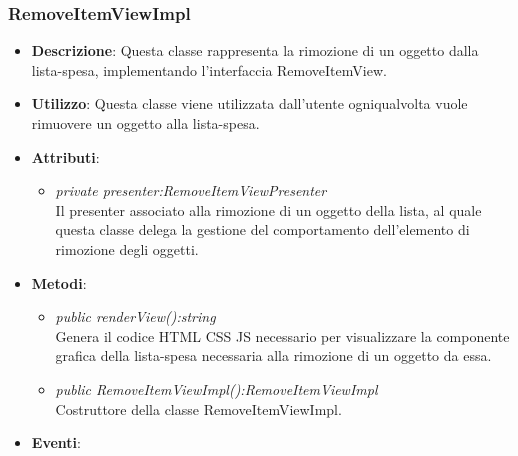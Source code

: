 \subsubsection{RemoveItemViewImpl}
\begin{itemize}
\item \textbf{Descrizione}: Questa classe rappresenta la rimozione di un oggetto dalla lista-spesa, implementando l'interfaccia RemoveItemView.
\item \textbf{Utilizzo}: Questa classe viene utilizzata dall'utente ogniqualvolta vuole rimuovere un oggetto alla lista-spesa.
\item \textbf{Attributi}: 
	\begin{itemize}
	\item \textit{private presenter:RemoveItemViewPresenter}\\
	Il presenter associato alla rimozione di un oggetto della lista, al quale questa classe delega la gestione del comportamento dell'elemento di rimozione degli oggetti.
	\end{itemize}
\item \textbf{Metodi}:
	\begin{itemize}
	\item \textit{public renderView():string}\\
		Genera il codice HTML CSS JS necessario per visualizzare la componente grafica della lista-spesa necessaria alla rimozione di un oggetto da essa.
	\item \textit{public RemoveItemViewImpl():RemoveItemViewImpl}\\
	Costruttore della classe RemoveItemViewImpl.
	\end{itemize}
\item \textbf{Eventi}:
\end{itemize}

